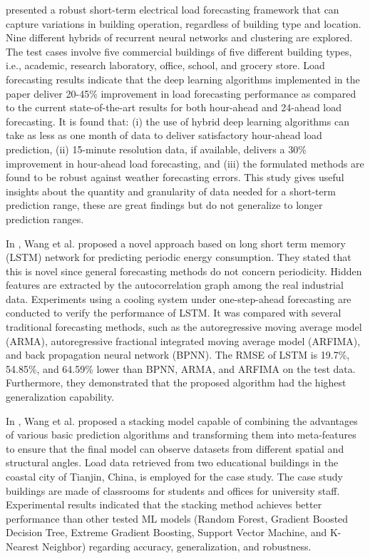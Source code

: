 \cite{CHITALIA2020115410} presented a robust short-term electrical load forecasting framework that can capture variations in building operation, regardless of building type and location.
Nine different hybrids of recurrent neural networks and clustering are explored.
The test cases involve five commercial buildings of five different building types, i.e., academic, research laboratory, office, school, and grocery store.
Load forecasting results indicate that the deep learning algorithms implemented in the paper deliver 20-45\% improvement in load forecasting performance as compared to the current state-of-the-art results for both hour-ahead and 24-ahead load forecasting.
It is found that:
(i) the use of hybrid deep learning algorithms can take as less as one month of data to deliver satisfactory hour-ahead load prediction,
(ii) 15-minute resolution data, if available, delivers a 30\% improvement in hour-ahead load forecasting,
and (iii) the formulated methods are found to be robust against weather forecasting errors.
This study gives useful insights about the quantity and granularity of data needed for a short-term prediction range, these are great findings but do not generalize to longer prediction ranges.

In \cite{WANG2020117197}, Wang et al. proposed a novel approach based on long short term memory (LSTM) network for predicting periodic energy consumption.
They stated that this is novel since general forecasting methods do not concern periodicity.
Hidden features are extracted by the autocorrelation graph among the real industrial data.
Experiments using a cooling system under one-step-ahead forecasting are conducted to verify the performance of LSTM.
It was compared with several traditional forecasting methods, such as the autoregressive moving average model (ARMA), autoregressive fractional integrated moving average model (ARFIMA), and back propagation neural network (BPNN).
The RMSE of LSTM is 19.7\%, 54.85\%, and 64.59\% lower than BPNN, ARMA, and ARFIMA on the test data.
Furthermore, they demonstrated that the proposed algorithm had the highest generalization capability.

In \cite{WANG2020114561}, Wang et al. proposed a stacking model capable of combining the advantages of various basic prediction algorithms and transforming them into meta-features to ensure that the final model can observe datasets from different spatial and structural angles.
Load data retrieved from two educational buildings in the coastal city of Tianjin, China, is employed for the case study.
The case study buildings are made of classrooms for students and offices for university staff.
Experimental results indicated that the stacking method achieves better performance than other tested ML models (Random Forest, Gradient Boosted Decision Tree, Extreme Gradient Boosting, Support Vector Machine, and K-Nearest Neighbor) regarding accuracy, generalization, and robustness.

